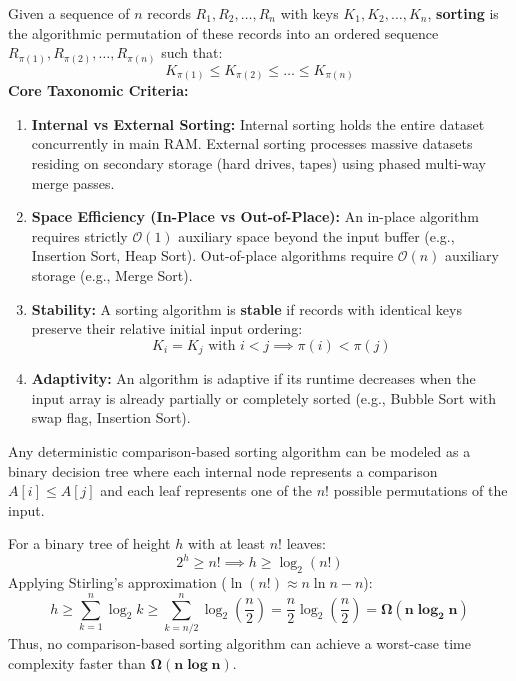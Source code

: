 \documentclass[12pt,a4paper]{article}
\begin{document}
\begin{tcolorbox}[defbox, title={\textbf{Definition: Sorting Problem and Taxonomic Criteria}}]
Given a sequence of $n$ records $R_1, R_2, \dots, R_n$ with keys $K_1, K_2, \dots, K_n$, \textbf{sorting} is the algorithmic permutation of these records into an ordered sequence $R_{\pi(1)}, R_{\pi(2)}, \dots, R_{\pi(n)}$ such that:
\begin{equation}
  K_{\pi(1)} \le K_{\pi(2)} \le \dots \le K_{\pi(n)}
\end{equation}
\textbf{Core Taxonomic Criteria:}
\begin{enumerate}[leftmargin=*, nosep]
  \item \textbf{Internal vs External Sorting:} Internal sorting holds the entire dataset concurrently in main RAM. External sorting processes massive datasets residing on secondary storage (hard drives, tapes) using phased multi-way merge passes.
  \item \textbf{Space Efficiency (In-Place vs Out-of-Place):} An in-place algorithm requires strictly $\mathcal{O}(1)$ auxiliary space beyond the input buffer (e.g., Insertion Sort, Heap Sort). Out-of-place algorithms require $\mathcal{O}(n)$ auxiliary storage (e.g., Merge Sort).
  \item \textbf{Stability:} A sorting algorithm is \textbf{stable} if records with identical keys preserve their relative initial input ordering:
  \begin{equation}
    K_i = K_j \text{ with } i < j \implies \pi(i) < \pi(j)
  \end{equation}
  \item \textbf{Adaptivity:} An algorithm is adaptive if its runtime decreases when the input array is already partially or completely sorted (e.g., Bubble Sort with swap flag, Insertion Sort).
\end{enumerate}
\end{tcolorbox}

\begin{tcolorbox}[formulabox, title={\textbf{Theoretical Lower Bound for Comparison-Based Sorting}}]
Any deterministic comparison-based sorting algorithm can be modeled as a binary decision tree where each internal node represents a comparison $A[i] \le A[j]$ and each leaf represents one of the $n!$ possible permutations of the input.
\par\vspace{3pt}
For a binary tree of height $h$ with at least $n!$ leaves:
\begin{equation}
  2^h \ge n! \implies h \ge \log_2(n!)
\end{equation}
Applying Stirling's approximation ($\ln(n!) \approx n \ln n - n$):
\begin{equation}
  h \ge \sum_{k=1}^n \log_2 k \ge \sum_{k=n/2}^n \log_2\left(\frac{n}{2}\right) = \frac{n}{2} \log_2\left(\frac{n}{2}\right) = \mathbf{\Omega(n \log_2 n)}
\end{equation}
Thus, no comparison-based sorting algorithm can achieve a worst-case time complexity faster than $\mathbf{\Omega(n \log n)}$.
\end{tcolorbox}
\end{document}
